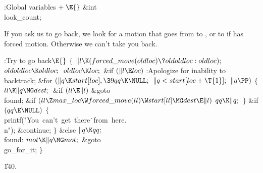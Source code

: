\B{}:Global variables\X${}\mathrel+\E{}$\6
\&{int} \\{look\_count};\par
\fi

If you ask us to go back, we look for a motion that goes from 
to , or to  if  has forced
motion.
Otherwise we can't take you back.

\Y\B\4:Try to go back\X${}\E{}$\6
${}\{{}$\1\6
${}\|l\K(\\{forced\_move}(\\{oldloc})\?\\{oldoldloc}:\\{oldloc});{}$\6
${}\\{oldoldloc}\K\\{oldloc};{}$\6
${}\\{oldloc}\K\\{loc};{}$\6
\&{if} ${}(\|l\E\\{loc}){}$\1\5
:Apologize for inability to backtrack\X;\2\6
\&{for} ${}(\|q\K\\{start}[\\{loc}],\39\\{qq}\K\NULL;{}$ ${}\|q<\\{start}[%
\\{loc}+\T{1}];{}$ ${}\|q\PP){}$\5
${}\{{}$\1\6
${}\\{ll}\K\|q\MG\\{dest};{}$\6
\&{if} ${}(\\{ll}\E\|l){}$\1\5
\&{goto} \\{found};\2\6
\&{if} ${}(\\{ll}\Z\\{max\_loc}\W\\{forced\_move}(\\{ll})\W\\{start}[\\{ll}]\MG%
\\{dest}\E\|l){}$\1\5
${}\\{qq}\K\|q;{}$\2\6
\4${}\}{}$\2\6
\&{if} ${}(\\{qq}\E\NULL){}$\5
${}\{{}$\1\6
\\{printf}(\.{"You\ can't\ get\ there}\)\.{\ from\ here.\\n"});\5
\&{continue};\6
\4${}\}{}$\2\6
\&{else}\1\5
${}\|q\K\\{qq};{}$\2\6
\4\\{found}:\5
${}\\{mot}\K\|q\MG\\{mot};{}$\6
\&{goto} \\{go\_for\_it};\6
\4${}\}{}$\2\par
\U140.\fi

